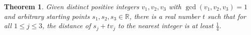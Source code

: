 \documentclass[11pt]{amsart}
\newtheorem{theorem}{Theorem}[section]
\newtheorem{conj}{Conjecture}[section]
\begin{document}




\begin{theorem}
\label{the2}
    Given distinct positive integers $v_1, v_2, v_3$ with $\gcd(v_1,v_2,v_3) = 1$ and arbitrary starting points $s_1, s_2, s_3 \in \mathbb{R}$, there is a real number $t$ such that for all $1 \leq j \leq 3$, the distance of $s_j + tv_j$ to the nearest integer is at least $\frac{1}{4}$.
\end{theorem}
\end{document}
